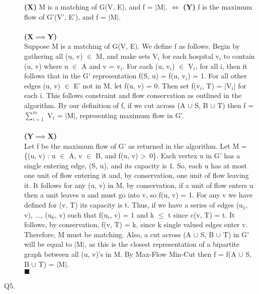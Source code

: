 \documentclass[10pt]{csc_assignment}
\begin{document}
\begin{description}
\textbf{(X)} M is a matching of G(V, E), and f = $\mid$M$\mid$. $\iff$ \textbf{(Y)} f is the maximum flow of G'(V', E'), and f = $\mid$M$\mid$.\\ 
\\
\textbf{(X$\implies$Y)}\\
Suppose M is a matching of G(V, E). We define f as follows. Begin by gathering all (u, v) $\in$ M, and make sets V$_{i}$ for each hospital v$_{i}$ to contain (u, v) where u $\in$ A and v = v$_{i}$. For each (u, v$_{i}$) $\in$ V$_{i}$, for all i, then it follows that in the G' representation f(S, u) = f(u, v$_{i}$) = 1. For all other edges (u, v) $\in$ E' not in M, let f(u, v) = 0. Then set f(v$_{i}$, T) = $\mid$V$_{i}$$\mid$ for each i. This follows constraint and flow conservation as outlined in the algorithm. By our definition of f, if we cut across (A $\cup$ {S}, B $\cup$ {T}) then f = $\sum_{i=1}^{m}$ V$_{i}$ = $\mid$M$\mid$, representing maximum flow in G'.\\
\\
\textbf{(Y$\implies$X)}\\
Let f be the maximum flow of G' as returned in the algorithm. Let M = \{(u, v) : u $\in$ A, v $\in$ B, and f(u, v) \textgreater ~0\}. Each vertex u in G' has a single entering edge, (S, u), and its capacity is 1. So, each u has at most one unit of flow entering it and, by conservation, one unit of flow leaving it. It follows for any (u, v) in M, by conservation, if a unit of flow enters u then a unit leaves u and must go into v, so f(u, v) = 1. For any v we have defined for (v, T) its capacity is t. Thus, if we have a series of edges {(u$_{1}$, v), ..., (u$_{k}$, v)} such that f(u$_{i}$, v) = 1 and k $\leqslant$ t since c(v, T) = t. It follows, by conservation, f(v, T) = k, since k single valued edges enter v. Therefore, M must be matching. Also, a cut across (A $\cup$ {S}, B $\cup$ {T}) in G' will be equal to $\mid$M$\mid$, as this is the closest representation of a bipartite graph between all (u, v)'s in M. By Max-Flow Min-Cut then f = f(A $\cup$ {S}, B $\cup$ {T}) = $\mid$M$\mid$. \\$\blacksquare$\\
    

\newpage
\item[Q5.]


\end{description}
\end{document}
